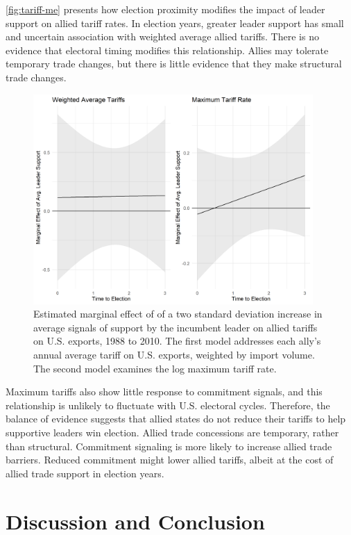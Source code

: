 \documentclass[12pt]{article}
\begin{document}
\autoref{fig:tariff-me} presents how election proximity modifies the impact of leader support on allied tariff rates.
In election years, greater leader support has small and uncertain association with weighted average allied tariffs. 
There is no evidence that electoral timing modifies this relationship.
Allies may tolerate temporary trade changes, but there is little evidence that they make structural trade changes.


\begin{figure}[htpb]
	\centering
		\includegraphics[width=0.95\textwidth]{../figures/tariff-me.png}
	\caption{Estimated marginal effect of of a two standard deviation increase in average signals of support by the incumbent leader on allied tariffs on U.S. exports, 1988 to 2010. The first model addresses each ally's annual average tariff on U.S. exports, weighted by import volume. The second model examines the log maximum tariff rate.}
	\label{fig:tariff-me}
\end{figure}


Maximum tariffs also show little response to commitment signals, and this relationship is unlikely to fluctuate with U.S. electoral cycles.
Therefore, the balance of evidence suggests that allied states do not reduce their tariffs to help supportive leaders win election.
Allied trade concessions are temporary, rather than structural.
Commitment signaling is more likely to increase allied trade barriers.
Reduced commitment might lower allied tariffs, albeit at the cost of allied trade support in election years.


\section{Discussion and Conclusion}
\end{document}
